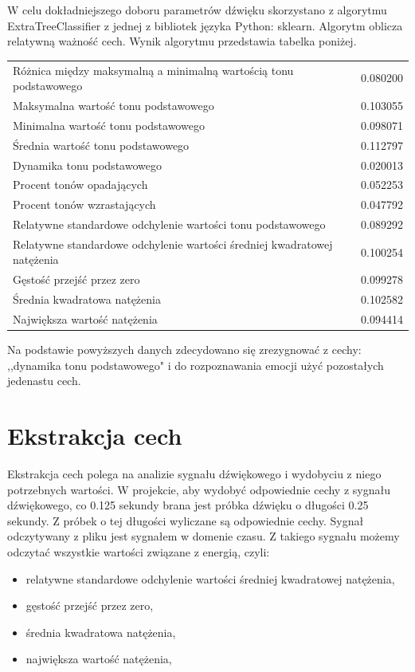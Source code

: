 \documentclass[declaration,shortabstract]{iithesis}
\begin{document}
W celu dokładniejszego doboru parametrów dźwięku skorzystano z algorytmu ExtraTreeClassifier z jednej z bibliotek języka Python: sklearn. Algorytm oblicza relatywną ważność cech. Wynik algorytmu przedstawia tabelka poniżej.

\begin{tabular}{ l | r }

Różnica między maksymalną a minimalną wartością tonu podstawowego & 0.080200 \\
Maksymalna wartość tonu podstawowego & 0.103055 \\
Minimalna wartość tonu podstawowego & 0.098071 \\
Średnia wartość tonu podstawowego & 0.112797 \\
Dynamika tonu podstawowego & 0.020013 \\
Procent tonów opadających & 0.052253 \\
Procent tonów wzrastających & 0.047792 \\
Relatywne standardowe odchylenie wartości tonu podstawowego & 0.089292 \\
Relatywne standardowe odchylenie wartości średniej kwadratowej natężenia & 0.100254 \\
Gęstość przejść przez zero & 0.099278 \\
Średnia kwadratowa natężenia & 0.102582 \\
Największa wartość natężenia & 0.094414 \\
\end{tabular}

Na podstawie powyższych danych zdecydowano się zrezygnować z cechy: ,,dynamika tonu podstawowego" i do rozpoznawania emocji użyć pozostałych jedenastu cech.

\section{Ekstrakcja cech}

Ekstrakcja cech polega na analizie sygnału dźwiękowego i wydobyciu z niego potrzebnych wartości. W projekcie, aby wydobyć odpowiednie cechy z sygnału dźwiękowego, co 0.125 sekundy brana jest próbka dźwięku o długości 0.25 sekundy. Z próbek o tej długości wyliczane są odpowiednie cechy. Sygnał odczytywany z pliku jest sygnałem w domenie czasu. Z takiego sygnału możemy odczytać wszystkie wartości związane z energią, czyli:
\begin{itemize}
\item relatywne standardowe odchylenie wartości średniej kwadratowej natężenia,
\item gęstość przejść przez zero,
\item średnia kwadratowa natężenia, 
\item największa wartość natężenia,
\end{itemize}
\end{document}
